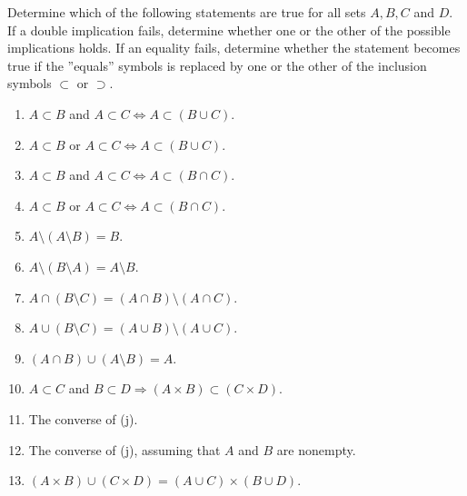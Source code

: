 \documentclass[a4paper,12pt]{article}
\begin{document}
\begin{exe}
	Determine which of the following statements are true for all sets \( A,B,C \) and \( D \).
	If a double implication fails, determine whether one or the other of the possible implications holds.
	If an equality fails, determine whether the statement becomes true
	if the ''equals'' symbols is replaced by one or the other of the inclusion symbols
	\( \subset \) or \( \supset \).
	\begin{enumerate}
		\item
		      \( A\subset B \) and \( A\subset C \Leftrightarrow A \subset (B \cup C) \).
		      
		\item
		      \( A\subset B \) or \( A\subset C \Leftrightarrow A \subset (B \cup C) \).
		      
		\item
		      \( A\subset B \) and \( A\subset C \Leftrightarrow A \subset (B \cap C) \).
		      
		\item
		      \( A\subset B \) or \( A\subset C \Leftrightarrow A \subset (B \cap C) \).
		      
		\item
		      \( A \setminus (A \setminus B) = B\).
		      
		\item
		      \( A \setminus (B \setminus A) = A \setminus B\).
		      
		\item
		      \( A\cap (B\setminus C) = (A \cap B) \setminus (A \cap C) \).
		      
		\item
		      \( A\cup (B\setminus C) = (A \cup B) \setminus (A \cup C) \).
		      
		\item \( (A \cap B) \cup (A \setminus B) = A \).
		      
		\item
		      \( A\subset C \) and \( B \subset D \Rightarrow (A \times B) \subset (C \times D)\).
		      
		\item
		      The converse of (j).
		      
		\item
		      The converse of (j), assuming that \( A \) and \( B \) are nonempty.
		      
		\item
		      \( (A\times B) \cup (C \times D) = (A \cup C) \times (B \cup D) \).
		      

\end{enumerate}
\end{exe}
\end{document}
